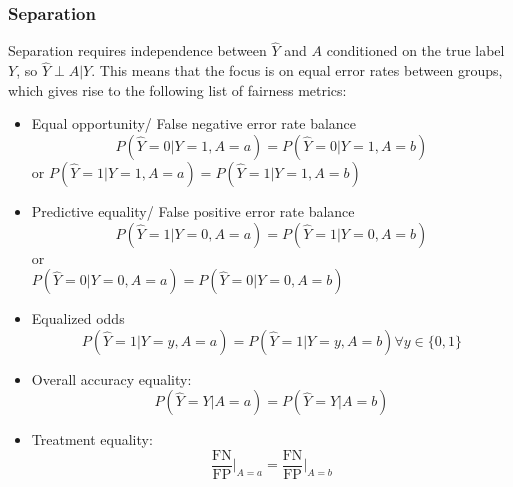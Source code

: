 \subsubsection*{Separation}
Separation requires independence between $\hat{Y}$ and $A$ conditioned on the true label $Y$, so $\hat{Y} \perp A | Y$. This means that the focus is on equal error rates between groups, which gives rise to the following list of fairness metrics:
\begin{itemize}
    \item Equal opportunity/ False negative error rate balance $$P(\hat{Y} = 0 | Y = 1, A = a) = P(\hat{Y} = 0 | Y = 1, A = b)$$ or $P(\hat{Y} = 1 | Y = 1, A = a) = P(\hat{Y} = 1 | Y = 1, A = b)$
    \item Predictive equality/ False positive error rate balance $$P(\hat{Y} = 1 | Y = 0, A = a) = P(\hat{Y} = 1 | Y = 0, A = b)$$ or \\ $P(\hat{Y} = 0 | Y = 0, A = a) = P(\hat{Y} = 0 | Y = 0, A = b)$ 
    \item Equalized odds $$P(\hat{Y} = 1 | Y = y, A = a) = P(\hat{Y} = 1 | Y = y, A = b) \forall y \in \{0, 1\}$$ 
    \item Overall accuracy equality: $$P(\hat{Y} = Y | A = a) = P(\hat{Y} = Y | A = b)$$ 
    \item Treatment equality: $$\frac{\text{FN}}{\text{FP}} \big|_{A = a} = \frac{\text{FN}}{\text{FP}} \big|_{A = b}$$
\end{itemize}

